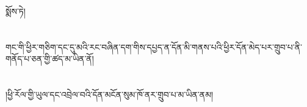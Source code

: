 སྨོས་ཏེ།\chapter{ }གང་གི་ཕྱིར་གཅིག་དང་དུ་མའི་རང་བཞིན་དག་གིས་དཔྱད་ན་དོན་མི་གནས་པའི་ཕྱིར་དོན་མེད་པར་གྲུབ་པ་ནི་གནོད་པ་ཅན་གྱི་ཚད་མ་ཡིན་ནོ།\chapter{ }།ཕྱི་རོལ་གྱི་ཡུལ་དང་འབྲེལ་བའི་དོན་མངོན་སུམ་ཁོ་ནར་གྲུབ་པ་མ་ཡིན་ནམ།\chapt